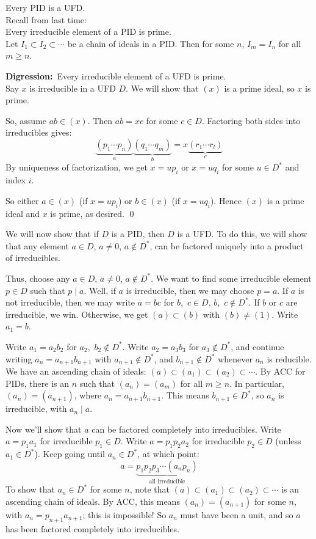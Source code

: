\thm Every PID is a UFD. \\
\pf Recall from last time: \\
\thm Every irreducible element of a PID is prime. \\
\thm Let $I_1\subset I_2\subset\dotsb$ be a chain of ideals in a PID.  Then for some $n$, $I_m=I_n$ for all $m\geq n$.

\textbf{Digression:}~Every irreducible element of a UFD is prime. \\
\pf Say $x$ is irreducible in a UFD $D$.  We will show that $(x)$ is a prime ideal, so $x$ is prime.

So, assume $ab\in(x)$.  Then $ab=xc$ for some $c\in D$.  Factoring both sides into irreducibles gives:
\[ \underbrace{(p_1\dotsm p_n)}_a\underbrace{(q_1\dotsm q_m)}_b=x\underbrace{(r_1\dotsm r_l)}_c \]
By uniqueness of factorization, we get $x=up_i$ or $x=uq_i$ for some $u\in D^*$ and index $i$.

So either $a\in(x)$ (if $x=up_i$) or $b\in(x)$ (if $x=uq_i$).  Hence $(x)$ is a prime ideal and $x$ is prime, as desired. \qed

We will now show that if $D$ is a PID, then $D$ is a UFD.  To do this, we will show that any element $a\in D$, $a\neq0$, $a\notin D^*$, can be factored uniquely into a product of irreducibles.

Thus, choose any $a\in D$, $a\neq0$, $a\notin D^*$.  We want to find some irreducible element $p\in D$ such that $p\mid a$.  Well, if $a$ is irreducible, then we may choose $p=a$.  If $a$ is not irreducible, then we may write $a=bc$ for $b$,~$c\in D$, $b$,~$c\notin D^*$.  If $b$ or $c$ are irreducible, we win.  Otherwise, we get $(a)\subset(b)$ with $(b)\neq(1)$.  Write $a_1=b$.

Write $a_1=a_2b_2$ for $a_2$,~$b_2\notin D^*$.  Write $a_2=a_3b_3$ for $a_3\notin D^*$, and continue writing $a_n=a_{n+1}b_{n+1}$ with $a_{n+1}\notin D^*$, and $b_{n+1}\notin D^*$ whenever $a_n$ is reducible.  We have an ascending chain of ideals: $(a)\subset(a_1)\subset(a_2)\subset\dotsb$.  By ACC for PIDs, there is an $n$ such that $(a_n)=(a_m)$ for all $m\geq n$.  In particular, $(a_n)=(a_{n+1})$, where $a_n=a_{n+1}b_{n+1}$.  This means $b_{n+1}\in D^*$, so $a_n$ is irreducible, with $a_n\mid a$.

Now we'll show that $a$ can be factored completely into irreducibles.  Write $a=p_1a_1$ for irreducible $p_1\in D$.  Write $a=p_1p_2a_2$ for irreducible $p_2\in D$ (unless $a_1\in D^*$).  Keep going until $a_n\in D^*$, at which point:
\[ a = \underbrace{p_1 p_2 p_3 \dotsm (a_n p_n)}_{\text{all irreducible}} \]
To show that $a_n\in D^*$ for some $n$, note that $(a)\subset(a_1)\subset(a_2)\subset\dotsb$ is an ascending chain of ideals.  By ACC, this means $(a_n)=(a_{n+1})$ for some $n$, with $a_n=p_{n+1}a_{n+1}$; this is impossible!  So $a_n$ must have been a unit, and so $a$ has been factored completely into irreducibles.

